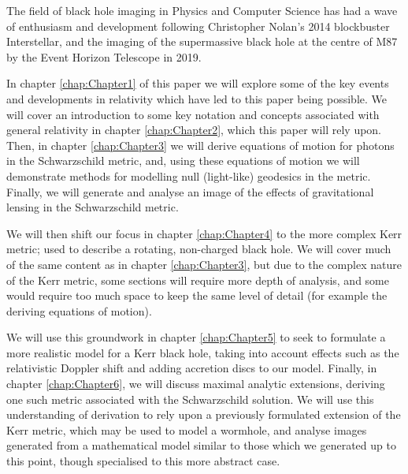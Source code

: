 \documentclass[oneside,openright,frontopenright, singlespacing]{dmathesis}
\begin{document}
\begin{introduction}

	The field of black hole imaging in Physics and Computer Science has had a wave of enthusiasm and development following Christopher Nolan’s 2014 blockbuster Interstellar\cite{Interstellar}, and the imaging of the supermassive black hole at the centre of M87 by the Event Horizon Telescope in 2019\cite{event2019first}.

\vspace{1em}
	 In chapter \ref{chap:Chapter1} of this paper we will explore some of the key events and developments in relativity which have led to this paper being possible. We will cover an introduction to some key notation and concepts associated with general relativity in chapter \ref{chap:Chapter2}, which this paper will rely upon. Then, in chapter \ref{chap:Chapter3} we will derive equations of motion for photons in the Schwarzschild metric, and, using these equations of motion we will demonstrate methods for modelling null (light-like) geodesics in the metric. Finally, we will generate and analyse an image of the effects of gravitational lensing in the Schwarzschild metric.

\vspace{1em}
	We will then shift our focus in chapter \ref{chap:Chapter4} to the more complex Kerr metric; used to describe a rotating, non-charged black hole. We will cover much of the same content as in chapter \ref{chap:Chapter3}, but due to the complex nature of the Kerr metric, some sections will require more depth of analysis, and some would require too much space to keep the same level of detail (for example the deriving equations of motion).

\vspace{1em}
	We will use this groundwork in chapter \ref{chap:Chapter5} to seek to formulate a more realistic model for a Kerr black hole, taking into account effects such as the relativistic Doppler shift and adding accretion discs to our model. Finally, in chapter \ref{chap:Chapter6}, we will discuss maximal analytic extensions, deriving one such metric associated with the Schwarzschild solution. We will use this understanding of derivation to rely upon a previously formulated extension of the Kerr metric, which may be used to model a wormhole, and analyse images generated from a mathematical model similar to those which we generated up to this point, though specialised to this more abstract case. 

\vspace{1em}
	

\end{introduction}
\end{document}
